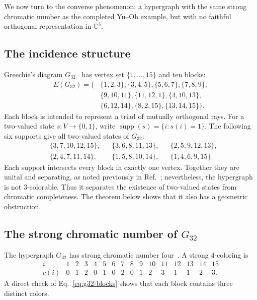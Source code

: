 \documentclass[aps,pra,twocolumn,superscriptaddress,10pt]{revtex4-2}
\newcommand{\C}{\mathbb{C}}
\begin{document}
We now turn to the converse phenomenon: a hypergraph with the same strong
chromatic number as the completed Yu--Oh example, but with no faithful
orthogonal representation in $\C^3$.

\subsection{The incidence structure}

Greechie's diagram $G_{32}$~\cite[Fig.~6]{greechie:71} has vertex set
$\{1,\ldots,15\}$ and ten blocks:
\begin{equation}\label{eq:g32-blocks}
\begin{aligned}
E(G_{32})=\{&\{1,2,3\},
\{3,4,5\},
\{5,6,7\},
\{7,8,9\},\\
&\{9,10,11\},
\{11,12,1\},
\{4,10,13\},\\
&\{6,12,14\},
\{8,2,15\},
\{13,14,15\}\}.
\end{aligned}
\end{equation}
Each block is intended to represent a triad of mutually orthogonal rays.
For a two-valued state $s:V\to\{0,1\}$, write
$\operatorname{supp}(s)=\{i:s(i)=1\}$.  The following six supports give all
two-valued states of $G_{32}$:
\begin{align*}
&\{3,7,10,12,15\}, &&\{3,6,8,11,13\},
&&\{2,5,9,12,13\},\\
&\{2,4,7,11,14\}, &&\{1,5,8,10,14\},
&&\{1,4,6,9,15\}.
\end{align*}
Each support intersects every block in exactly one vertex.  Together they are
unital and separating, as noted previously in Ref.~\cite{svozil-2021-chroma};
nevertheless, the hypergraph is not 3-colorable.  Thus it separates the
existence of two-valued states from chromatic completeness.  The theorem below
shows that it also has a geometric obstruction.

\subsection{The strong chromatic number of
\texorpdfstring{$G_{32}$}{G32}}\label{sec:g32-chromatic}

The hypergraph $G_{32}$ has strong chromatic number four~\cite{svozil-2021-chroma}.  A strong
4-coloring is
\begin{equation}\label{eq:g32-coloring}
\begin{array}{c|rrrrrrrrrrrrrrr}
 i    &1&2&3&4&5&6&7&8&9&10&11&12&13&14&15\\ \hline
 c(i) &0&1&2&0&1&0&2&0&1&2&3&1&1&2&3.
\end{array}
\end{equation}
A direct check of Eq.~\eqref{eq:g32-blocks} shows that each block contains
three distinct colors.
\end{document}
